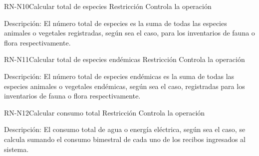 \begin{BusinessRule}{RN-N10}{Calcular total de especies}
    {Restricción}
    {Controla la operación}
    \item[Descripción:] El número total de especies es la suma de todas las especies animales o vegetales registradas, según sea el caso, para los inventarios de fauna o flora respectivamente.
\end{BusinessRule}
\begin{BusinessRule}{RN-N11}{Calcular total de especies endémicas}
    {Restricción}
    {Controla la operación}
    \item[Descripción:] El número total de especies endémicas es la suma de todas las especies animales o vegetales endémicas, según sea el caso, registradas para los inventarios de fauna o flora respectivamente.
\end{BusinessRule}

\begin{BusinessRule}{RN-N12}{Calcular consumo total}
    {Restricción}
    {Controla la operación}
    \item[Descripción:] El consumo total de agua o energía eléctrica, según sea el caso, se calcula sumando el consumo bimestral de cada uno de los recibos ingresados al sistema.
\end{BusinessRule}

